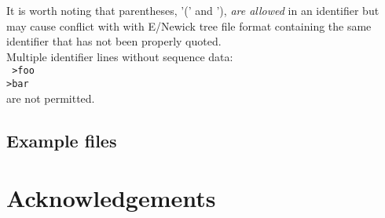 \documentclass[12pt]{article}
\begin{document}
It is worth noting that parentheses, '(' and '), \textit{are allowed} in an identifier but may cause conflict with with E/Newick tree file format \citep{Cardonaetal2008} containing the same identifier that has not been properly quoted. \\

Multiple identifier lines without sequence data:\\
\texttt{	
>foo\\
>bar\\
}
are not permitted.

\subsection{Example files}

\section{Acknowledgements}
\newpage

\end{document}
